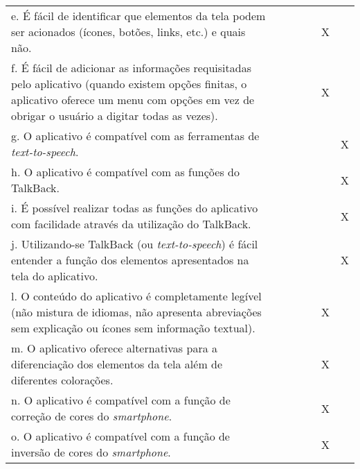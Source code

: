 \documentclass[portuguese,oneside]{tcc}
\begin{document}
\begin{center}
\begin{longtabu}{|L{25em}|c|c|c|c|c|c|}
	e. É fácil de identificar que elementos da tela podem ser acionados (ícones, botões, links, etc.) e quais não. & & & & & X & \\ 
	f. É fácil de adicionar as informações requisitadas pelo aplicativo (quando existem opções finitas, o aplicativo oferece um menu com opções em vez de obrigar o usuário a digitar todas as vezes). & & & & & X & \\ 
	g. O aplicativo é compatível com as ferramentas de \emph{text-to-speech}. & & & & & & X \\ 
	h. O aplicativo é compatível com as funções do TalkBack. & & & & & & X \\ 
	i. É possível realizar todas as funções do aplicativo com facilidade através da utilização do TalkBack.	& & & & & & X \\ 
	j. Utilizando-se TalkBack (ou \emph{text-to-speech}) é fácil entender a função dos elementos apresentados na tela do aplicativo. & & & & & & X \\ 
	l. O conteúdo do aplicativo é completamente legível (não mistura de idiomas, não apresenta abreviações sem explicação ou ícones sem informação textual). & & & & & X & \\ 
	m. O aplicativo oferece alternativas para a diferenciação dos elementos da tela além de diferentes colorações. & & & & & X & \\ 
	n. O aplicativo é compatível com a função de correção de cores do \emph{smartphone}. & & & & & X & \\ 
	o. O aplicativo é compatível com a função de inversão de cores do \emph{smartphone}. & & & & & X & \\ 
\end{longtabu}
\end{center}
\end{document}
